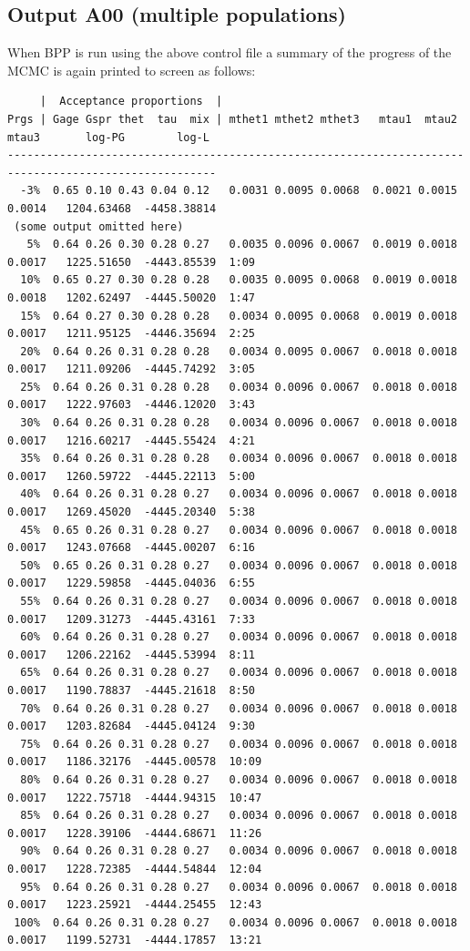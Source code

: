 \documentclass{book}
\numberwithin{equation}{section} \renewcommand{\baselinestretch}{0.55}
\begin{document}
\subsection{Output A00 (multiple populations)}
When BPP is run using the above control file a summary of the progress of the
MCMC is again printed to screen as follows:
{\tiny
\begin{verbatim}
     |  Acceptance proportions  |
Prgs | Gage Gspr thet  tau  mix | mthet1 mthet2 mthet3   mtau1  mtau2  mtau3       log-PG        log-L
------------------------------------------------------------------------------------------------------
  -3%  0.65 0.10 0.43 0.04 0.12   0.0031 0.0095 0.0068  0.0021 0.0015 0.0014   1204.63468  -4458.38814
 (some output omitted here)
   5%  0.64 0.26 0.30 0.28 0.27   0.0035 0.0096 0.0067  0.0019 0.0018 0.0017   1225.51650  -4443.85539  1:09
  10%  0.65 0.27 0.30 0.28 0.28   0.0035 0.0095 0.0068  0.0019 0.0018 0.0018   1202.62497  -4445.50020  1:47
  15%  0.64 0.27 0.30 0.28 0.28   0.0034 0.0095 0.0068  0.0019 0.0018 0.0017   1211.95125  -4446.35694  2:25
  20%  0.64 0.26 0.31 0.28 0.28   0.0034 0.0095 0.0067  0.0018 0.0018 0.0017   1211.09206  -4445.74292  3:05
  25%  0.64 0.26 0.31 0.28 0.28   0.0034 0.0096 0.0067  0.0018 0.0018 0.0017   1222.97603  -4446.12020  3:43
  30%  0.64 0.26 0.31 0.28 0.28   0.0034 0.0096 0.0067  0.0018 0.0018 0.0017   1216.60217  -4445.55424  4:21
  35%  0.64 0.26 0.31 0.28 0.28   0.0034 0.0096 0.0067  0.0018 0.0018 0.0017   1260.59722  -4445.22113  5:00
  40%  0.64 0.26 0.31 0.28 0.27   0.0034 0.0096 0.0067  0.0018 0.0018 0.0017   1269.45020  -4445.20340  5:38
  45%  0.65 0.26 0.31 0.28 0.27   0.0034 0.0096 0.0067  0.0018 0.0018 0.0017   1243.07668  -4445.00207  6:16
  50%  0.65 0.26 0.31 0.28 0.27   0.0034 0.0096 0.0067  0.0018 0.0018 0.0017   1229.59858  -4445.04036  6:55
  55%  0.64 0.26 0.31 0.28 0.27   0.0034 0.0096 0.0067  0.0018 0.0018 0.0017   1209.31273  -4445.43161  7:33
  60%  0.64 0.26 0.31 0.28 0.27   0.0034 0.0096 0.0067  0.0018 0.0018 0.0017   1206.22162  -4445.53994  8:11
  65%  0.64 0.26 0.31 0.28 0.27   0.0034 0.0096 0.0067  0.0018 0.0018 0.0017   1190.78837  -4445.21618  8:50
  70%  0.64 0.26 0.31 0.28 0.27   0.0034 0.0096 0.0067  0.0018 0.0018 0.0017   1203.82684  -4445.04124  9:30
  75%  0.64 0.26 0.31 0.28 0.27   0.0034 0.0096 0.0067  0.0018 0.0018 0.0017   1186.32176  -4445.00578  10:09
  80%  0.64 0.26 0.31 0.28 0.27   0.0034 0.0096 0.0067  0.0018 0.0018 0.0017   1222.75718  -4444.94315  10:47
  85%  0.64 0.26 0.31 0.28 0.27   0.0034 0.0096 0.0067  0.0018 0.0018 0.0017   1228.39106  -4444.68671  11:26
  90%  0.64 0.26 0.31 0.28 0.27   0.0034 0.0096 0.0067  0.0018 0.0018 0.0017   1228.72385  -4444.54844  12:04
  95%  0.64 0.26 0.31 0.28 0.27   0.0034 0.0096 0.0067  0.0018 0.0018 0.0017   1223.25921  -4444.25455  12:43
 100%  0.64 0.26 0.31 0.28 0.27   0.0034 0.0096 0.0067  0.0018 0.0018 0.0017   1199.52731  -4444.17857  13:21


\end{verbatim}}
\end{document}
